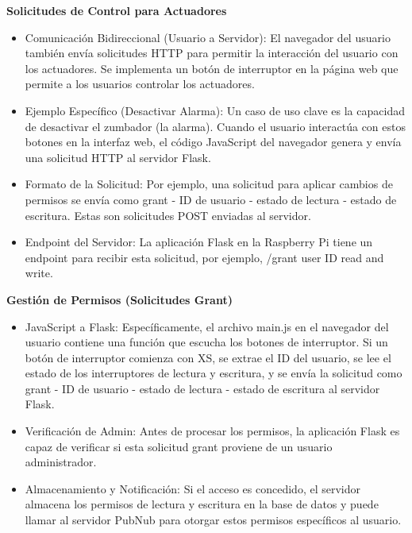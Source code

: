 \documentclass{report}
\begin{document}
\textbf{Solicitudes de Control para Actuadores}
\begin{itemize}
    \item Comunicación Bidireccional (Usuario a Servidor): El navegador del usuario también envía solicitudes HTTP para permitir la interacción del 
    usuario con los actuadores. Se implementa un botón de interruptor en la página web que permite a los usuarios controlar los actuadores.
    \item Ejemplo Específico (Desactivar Alarma): Un caso de uso clave es la capacidad de desactivar el zumbador (la alarma). Cuando el usuario 
    interactúa con estos botones en la interfaz web, el código JavaScript del navegador genera y envía una solicitud HTTP al servidor Flask.
    \item Formato de la Solicitud: Por ejemplo, una solicitud para aplicar cambios de permisos se envía como grant - ID de usuario - estado 
    de lectura - estado de escritura. Estas son solicitudes POST enviadas al servidor.
    \item Endpoint del Servidor: La aplicación Flask en la Raspberry Pi tiene un endpoint para recibir esta solicitud, por ejemplo, /grant user 
    ID read and write.
\end{itemize}

\textbf{Gestión de Permisos (Solicitudes Grant)}
\begin{itemize}
    \item JavaScript a Flask: Específicamente, el archivo main.js en el navegador del usuario contiene una función que escucha los botones de 
    interruptor. Si un botón de interruptor comienza con XS, se extrae el ID del usuario, se lee el estado de los interruptores de lectura y 
    escritura, y se envía la solicitud como grant - ID de usuario - estado de lectura - estado de escritura al servidor Flask.
    \item Verificación de Admin: Antes de procesar los permisos, la aplicación Flask es capaz de verificar si esta solicitud grant proviene de 
    un usuario administrador.
    \item Almacenamiento y Notificación: Si el acceso es concedido, el servidor almacena los permisos de lectura y escritura en la base de datos y 
    puede llamar al servidor PubNub para otorgar estos permisos específicos al usuario.
\end{itemize}
\end{document}
